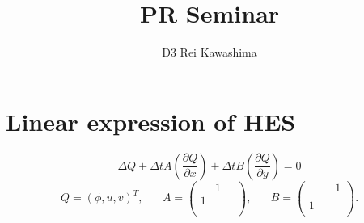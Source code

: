 \documentclass[a4paper]{PRseminar}
\title{PR Seminar}
\author{D3 Rei Kawashima}
\begin{document}
	


\section{Linear expression of HES}
	\begin{equation}
		\Delta Q+\Delta tA\left(\frac{\partial Q}{\partial x}\right)+\Delta tB\left(\frac{\partial Q}{\partial y}\right)=0
	\end{equation}
	\begin{equation}
		Q=\left(\phi,u,v\right)^T,
		\hspace{20pt}
		A=\left(\begin{array}{ccc}
			\  & 1 & \ \\
			1  & \ & \ \\
			\  & \ & \ \\
		\end{array}\right),
		\hspace{20pt}
		B=\left(\begin{array}{ccc}
			\  & \ & 1 \\
			\ & \  & \ \\
			1 & \ &\ \\
		\end{array}\right).
	\end{equation}
	
\end{document}
